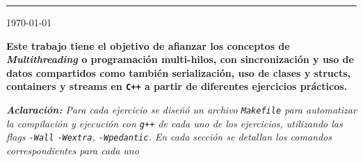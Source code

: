 \documentclass[11pt, a4paper]{article}
\begin{document}
{\noindent\rule{\textwidth}{0.5pt}}


\begin{center}
    {\large \today}
\end{center}

{\bfseries\selectfont Este trabajo tiene el objetivo de afianzar los conceptos de
\textit{Multithreading} o programación multi-hilos, con sincronización y uso de datos compartidos como también serialización, uso de clases y structs, containers y streams en \lstinline|C++| a partir de diferentes ejercicios prácticos.
}
\begin{center}
    \small\itshape\textbf{Aclaración:} Para cada ejercicio se diseñó un archivo \lstinline|Makefile| para automatizar la compilación y ejecución con \lstinline|g++| de cada uno de los ejercicios, utilizando las flags \lstinline|-Wall| \lstinline|-Wextra|, \lstinline|-Wpedantic|. En cada sección se detallan los comandos correspondientes para cada uno 
\end{center}
\end{document}
